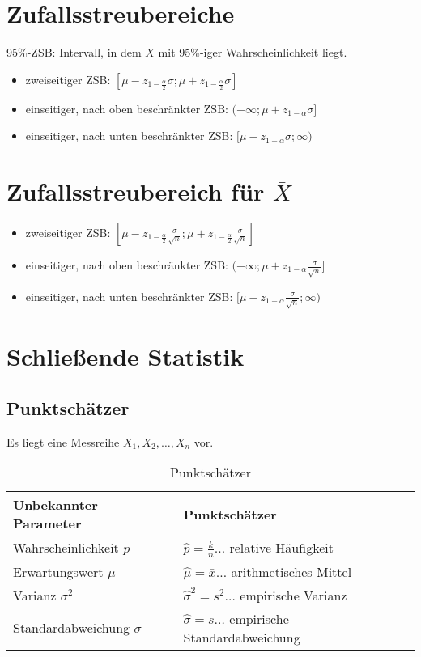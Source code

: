 \section{Zufallsstreubereiche}
95\%-ZSB: Intervall, in dem $X$ mit 95\%-iger Wahrscheinlichkeit liegt.

\begin{itemize}
	\item zweiseitiger ZSB: $\left[\mu-z_{1-\frac{\alpha}{2}}\sigma; \mu+z_{1-\frac{\alpha}{2}}\sigma\right]$
	\item einseitiger, nach oben beschränkter ZSB: $(-\infty;\mu+z_{1-\alpha}\sigma]$
	\item einseitiger, nach unten beschränkter ZSB: $[\mu-z_{1-\alpha}\sigma; \infty)$
\end{itemize}

\section{Zufallsstreubereich für $\bar{X}$}

\begin{itemize}
	\item zweiseitiger ZSB: $\left[\mu-z_{1-\frac{\alpha}{2}}\frac{\sigma}{\sqrt{n}}; \mu+z_{1-\frac{\alpha}{2}}\frac{\sigma}{\sqrt{n}}\right]$
	\item einseitiger, nach oben beschränkter ZSB: $(-\infty;\mu+z_{1-\alpha}\frac{\sigma}{\sqrt{n}}]$
	\item einseitiger, nach unten beschränkter ZSB: $[\mu-z_{1-\alpha}\frac{\sigma}{\sqrt{n}}; \infty)$
\end{itemize}

\section{Schließende Statistik}
\subsection{Punktschätzer}
Es liegt eine Messreihe $X_1, X_2, \dots, X_n$ vor.

\begin{table}[ht!]
	\begin{tabular}{ll}
		Unbekannter Parameter & Punktschätzer\\
		\toprule
		Wahrscheinlichkeit $p$ & $\hat{p}=\frac{k}{n}\dots$ relative Häufigkeit\\
		Erwartungswert $\mu$ & $\hat{\mu}=\bar{x}\dots$ arithmetisches Mittel\\
		Varianz $\sigma^2$ & $\hat{\sigma}^2 = s^2\dots$ empirische Varianz\\
		Standardabweichung $\sigma$ & $\hat{\sigma} = s\dots$ empirische Standardabweichung
	\end{tabular}
	\caption{Punktschätzer}
\end{table}

